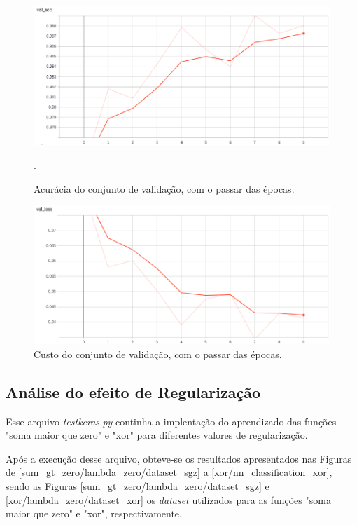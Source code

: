 \documentclass[conference]{IEEEtran}
\begin{document}
\begin{figure}[htbp]
\centering
\centerline{\includegraphics[scale=0.25]{imagens/val_acc.png}}
\caption{Acurácia do conjunto de validação, com o passar das épocas.}.
\label{val_acc}
\end{figure}

\begin{figure}[htbp]
\centering
\centerline{\includegraphics[scale=0.25]{imagens/val_loss.png}}
\caption{Custo do conjunto de validação, com o passar das épocas.}
\label{val_loss}
\end{figure}

\subsection{Análise do efeito de Regularização}
Esse arquivo \textit{test\underline{\space}keras.py} continha a implentação do aprendizado das funções "soma maior que zero" e "xor" para diferentes valores de regularização.

Após a execução desse arquivo, obteve-se os resultados apresentados nas Figuras de \ref{sum_gt_zero/lambda_zero/dataset_sgz} a \ref{xor/nn_classification_xor}, sendo as Figuras \ref{sum_gt_zero/lambda_zero/dataset_sgz} e \ref{xor/lambda_zero/dataset_xor} os \textit{dataset} utilizados para as funções "soma maior que zero" e "xor", respectivamente.
\end{document}
